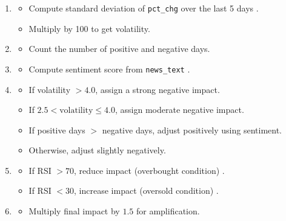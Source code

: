 \documentclass[3p,times,procedia]{elsarticle}
\begin{document}
\vspace{0.10cm}
\begin{enumerate}
    \item {}
    \begin{itemize}
        \item Compute standard deviation of \texttt{pct\_chg} over the last 5 days \cite{Engle1982}.
        \item Multiply by 100 to get volatility.
    \end{itemize}
    \vspace{0.40cm}
    \item {}
    \begin{itemize}
        \item Count the number of positive and negative days.
    \end{itemize}

    \item {}
    \begin{itemize}
        \item Compute sentiment score from \texttt{news\_text} \cite{TETLOCK2007}.
    \end{itemize}

    \item {}
    \begin{itemize}
        \item If volatility $> 4.0$, assign a strong negative impact.
        \item If $2.5 < \text{volatility} \leq 4.0$, assign moderate negative impact.
        \item If positive days $>$ negative days, adjust positively using sentiment.
        \item Otherwise, adjust slightly negatively.
    \end{itemize}

    \item {}
    \begin{itemize}
        \item If RSI $> 70$, reduce impact (overbought condition) \cite{Wilder1978}.
        \item If RSI $< 30$, increase impact (oversold condition) \cite{Wilder1978}.
    \end{itemize}

    \item {}
    \begin{itemize}
        \item Multiply final impact by $1.5$ for amplification.
    \end{itemize}
\end{enumerate}
\end{document}

